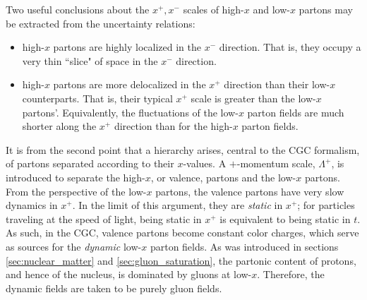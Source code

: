 Two useful conclusions about the $x^+,x^-$  scales of high-$x$ and low-$x$ partons may be extracted from the uncertainty relations:
\begin{itemize}
	\item[1)] high-$x$ partons are highly localized in the $x^-$ direction. That is, they occupy a very thin ``slice" of space in the $x^-$ direction.
	\item[2)] high-$x$ partons are more delocalized in the $x^+$ direction than their low-$x$ counterparts. That is, their typical $x^+$ scale %
is greater than the low-$x$ partons'. Equivalently, the fluctuations of the low-$x$ parton fields are much shorter along the $x^+$ direction than for the high-$x$ parton fields.
\end{itemize}


It is from the second point that a hierarchy arises, central to the \gls{CGC} formalism, of partons separated according to their $x$-values. A $+$-momentum scale, $\Lambda^+$, is introduced to separate the high-$x$, or valence, partons and the low-$x$ partons. From the perspective of the low-$x$ partons, the valence partons have very slow dynamics
in $x^+$. In the limit of this argument, they are \emph{static} in $x^+$; for particles traveling at the speed of light, being static in $x^+$ is equivalent to being static in $t$. As such, in the \gls{CGC}, valence partons become constant color charges, which serve as sources for the \emph{dynamic} low-$x$ parton fields.
As was introduced in sections \ref{sec:nuclear_matter} and \ref{sec:gluon_saturation}, the partonic content of protons, and hence of the nucleus, is dominated by gluons at low-$x$. Therefore, the dynamic fields are taken to be purely gluon fields.



